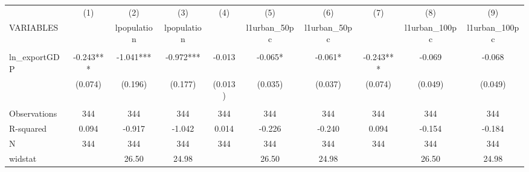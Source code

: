 \documentclass[]{article}
\begin{document}
\begin{tabular}{lccccccccc} \hline
 & (1) & (2) & (3) & (4) & (5) & (6) & (7) & (8) & (9) \\
VARIABLES &  & lpopulation & lpopulation &  & l1urban\_50pc & l1urban\_50pc &  & l1urban\_100pc & l1urban\_100pc \\ \hline
 &  &  &  &  &  &  &  &  &  \\
ln\_exportGDP & -0.243*** & -1.041*** & -0.972*** & -0.013 & -0.065* & -0.061* & -0.243*** & -0.069 & -0.068 \\
 & (0.074) & (0.196) & (0.177) & (0.013) & (0.035) & (0.037) & (0.074) & (0.049) & (0.049) \\
 &  &  &  &  &  &  &  &  &  \\
Observations & 344 & 344 & 344 & 344 & 344 & 344 & 344 & 344 & 344 \\
R-squared & 0.094 & -0.917 & -1.042 & 0.014 & -0.226 & -0.240 & 0.094 & -0.154 & -0.184 \\
N & 344 & 344 & 344 & 344 & 344 & 344 & 344 & 344 & 344 \\
 widstat &  & 26.50 & 24.98 &  & 26.50 & 24.98 &  & 26.50 & 24.98 \\ \hline
\end{tabular}
\end{document}
